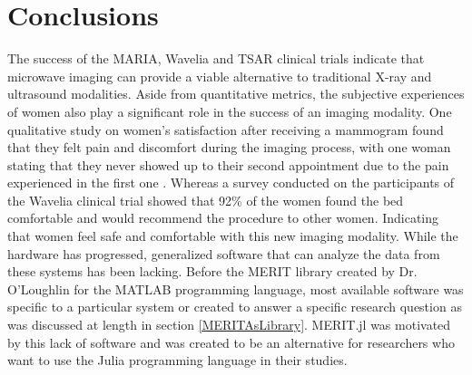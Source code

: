 \setcounter{chapter}{6}
\setcounter{section}{0}
\setcounter{subsection}{0}
\chapter*{Conclusions}
The success of the MARIA, Wavelia and TSAR clinical trials indicate that microwave imaging can provide a viable
alternative to traditional X-ray and ultrasound modalities. Aside from quantitative metrics, the subjective experiences
of women also play a significant role in the success of an imaging modality. One qualitative study on women's
satisfaction after receiving a mammogram found that they felt pain and discomfort during the imaging process, with one
woman stating that they never showed up to their second appointment due to the pain experienced in the first one
\cite{engelmanWomenSatisfactionTheir2006}. Whereas a survey conducted on the participants of the Wavelia clinical trial
showed that 92\% of the women found the bed comfortable and would recommend the procedure to other women. Indicating
that women feel safe and comfortable with this new imaging modality. While the hardware has progressed, generalized
software that can analyze the data from these systems has been lacking. Before the MERIT library created
by Dr. O'Loughlin for the MATLAB programming language, most available software was specific to a particular system or created to answer a specific research
question as was discussed at length in section \ref{MERITAsLibrary}. MERIT.jl was motivated by this lack of software and
was created to be an alternative for researchers who want to use the Julia programming language in their studies.

